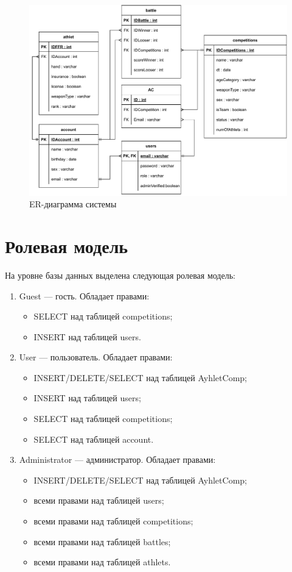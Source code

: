\begin{figure}[H]
	\includegraphics[width=1\columnwidth]{assets/erdb.drawio.pdf}
	\centering
	\caption{ER-диаграмма системы}
	\label{ris:erdb}
\end{figure}

\section{Ролевая модель}

На уровне базы данных выделена следующая ролевая модель:

\begin{enumerate}
	\item Guest --- гость. Обладает правами:
	\begin{itemize}
		\item SELECT над таблицей competitions;
		\item INSERT над таблицей users.
	\end{itemize}
	\item User --- пользователь. Обладает правами:
	\begin{itemize}
		\item INSERT/DELETE/SELECT над таблицей AyhletComp;
		\item INSERT над таблицей users;
		\item SELECT над таблицей competitions;
		\item SELECT над таблицей account.
	\end{itemize}
	\item Administrator --- администратор. Обладает правами:
	\begin{itemize}
		\item INSERT/DELETE/SELECT над таблицей AyhletComp;
		\item всеми правами над таблицей users;
		\item всеми правами над таблицей competitions;
		\item всеми правами над таблицей battles;
		\item всеми правами над таблицей athlets.
	\end{itemize}
\end{enumerate}

